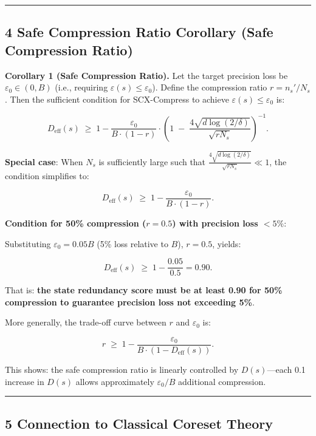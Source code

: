 \documentclass[
  12pt,
]{article}
\begin{document}
\begin{center}\rule{0.5\linewidth}{0.5pt}\end{center}

\subsection{4 Safe Compression Ratio Corollary (Safe Compression Ratio)}\label{safe-compression-ratio}

\textbf{Corollary 1 (Safe Compression Ratio).} Let the target precision loss be
\(\varepsilon_0 \in (0, B)\) (i.e., requiring \(\varepsilon(s) \leq \varepsilon_0\)). Define the compression ratio
\(r = n_s' / N_s\). Then the sufficient condition for SCX-Compress to achieve
\(\varepsilon(s) \leq \varepsilon_0\) is:

\[
D_{\text{eff}}(s) \;\geq\; 1 - \frac{\varepsilon_0}{B \cdot (1 - r)} \cdot
\left(1 \;-\; \frac{4\sqrt{d \log(2/\delta)}}{\sqrt{r N_s}}\right)^{-1}.
\tag{9}
\]

\textbf{Special case}: When \(N_s\) is sufficiently large such that
\(\frac{4\sqrt{d \log(2/\delta)}}{\sqrt{r N_s}} \ll 1\), the condition simplifies to:

\[
D_{\text{eff}}(s) \;\geq\; 1 - \frac{\varepsilon_0}{B \cdot (1 - r)}.
\tag{10}
\]

\textbf{Condition for 50\% compression (\(r = 0.5\)) with precision loss \(< 5\%\)}:

Substituting \(\varepsilon_0 = 0.05 B\) (5\% loss relative to \(B\)), \(r = 0.5\), yields:

\[
D_{\text{eff}}(s) \;\geq\; 1 - \frac{0.05}{0.5} = 0.90.
\]

That is: \textbf{the state redundancy score must be at least 0.90 for 50\% compression to guarantee precision loss not exceeding 5\%}.

More generally, the trade-off curve between \(r\) and \(\varepsilon_0\) is:

\[
r \;\geq\; 1 - \frac{\varepsilon_0}{B \cdot (1 - D_{\text{eff}}(s))}.
\tag{11}
\]

This shows: the safe compression ratio is linearly controlled by \(D(s)\)---each 0.1 increase in \(D(s)\) allows approximately \(\varepsilon_0/B\) additional compression.

\begin{center}\rule{0.5\linewidth}{0.5pt}\end{center}

\subsection{5 Connection to Classical Coreset Theory}\label{connection-classical-coreset}
\end{document}
